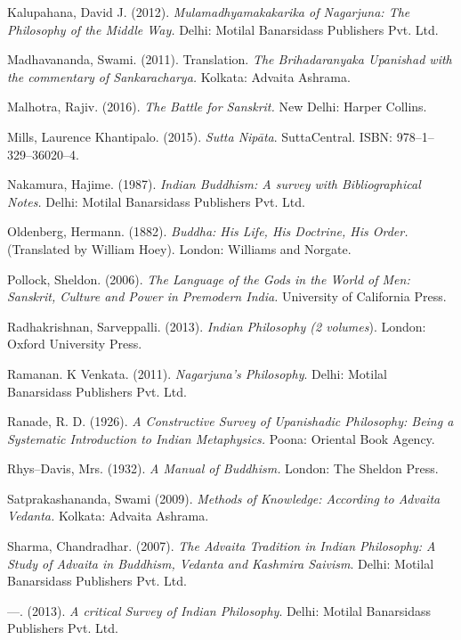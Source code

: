 \begin{thebibliography}{99}
  Kalupahana, David J. (2012). \textit{Mulamadhyamakakarika of Nagarjuna: The Philosophy of the Middle Way.} Delhi: Motilal Banarsidass Publishers Pvt. Ltd.

  Madhavananda, Swami. (2011). Translation. \textit{The Brihadaranyaka Upanishad with the commentary of Sankaracharya.} Kolkata: Advaita Ashrama.

  Malhotra, Rajiv. (2016). \textit{The Battle for Sanskrit.} New Delhi: Harper Collins.

  Mills, Laurence Khantipalo. (2015). \textit{Sutta Nipāta}. SuttaCentral. ISBN: 978–1–329–36020–4.

  Nakamura, Hajime. (1987).\textit{ Indian Buddhism: A survey with Bibliographical Notes.} Delhi: Motilal Banarsidass Publishers Pvt. Ltd.

  Oldenberg, Hermann. (1882). \textit{Buddha: His Life, His Doctrine, His Order.} (Translated by William Hoey). London: Williams and Norgate.

  Pollock, Sheldon. (2006).\textit{ The Language of the Gods in the World of Men: Sanskrit, Culture and Power in Premodern India.} University of California Press.

  Radhakrishnan, Sarveppalli. (2013). \textit{Indian Philosophy (2 volumes}). London: Oxford University Press.

  Ramanan. K Venkata. (2011). \textit{Nagarjuna’s Philosophy}. Delhi: Motilal Banarsidass Publishers Pvt. Ltd.

  Ranade, R. D. (1926). \textit{A Constructive Survey of Upanishadic Philosophy: Being a Systematic Introduction to Indian Metaphysics.} Poona: Oriental Book Agency.

  Rhys–Davis, Mrs. (1932). \textit{A Manual of Buddhism.} London: The Sheldon Press.

  Satprakashananda, Swami (2009). \textit{Methods of Knowledge: According to Advaita Vedanta.} Kolkata: Advaita Ashrama.

  Sharma, Chandradhar. (2007). \textit{The Advaita Tradition in Indian Philosophy: A Study of Advaita in Buddhism, Vedanta and Kashmira Saivism}. Delhi: Motilal Banarsidass Publishers Pvt. Ltd.

  —. (2013). \textit{A critical Survey of Indian Philosophy}. Delhi: Motilal Banarsidass Publishers Pvt. Ltd.


\end{thebibliography}

